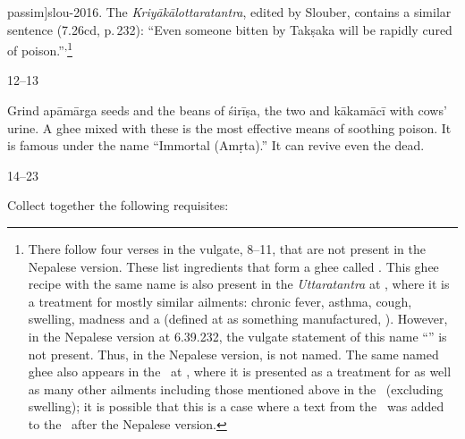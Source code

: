 \begin{translation}
{{                    passim}]{slou-2016}.  The
                    \emph{Kriyākālottaratantra}, edited by Slouber,
                    contains a similar sentence (7.26cd, p.\,232): “Even
                    someone bitten by Takṣaka will be rapidly cured of
                    poison.”}\textsuperscript{,}\footnote{There follow
                        four verses in the vulgate, 8--11, that are not
                        present in the Nepalese version.  These list
                        ingredients that form a ghee called
                        . This ghee recipe with
                        the same name is also present in the
                        \emph{Uttaratantra} at , where
                        it is a treatment for mostly similar ailments:
                        chronic fever, asthma, cough, swelling, madness and a
                         (defined at
                         as something manufactured,
                        ).  However, in the Nepalese version at
                        6.39.232, the vulgate statement of this name
                        “” is
                        not present. Thus, in the Nepalese version,
                         is not named. The same
                        named ghee also appears in the \CS\ at
                        , where it is presented as a
                        treatment for  as well as many
                        other ailments including those mentioned above in the
                        \SS\ (excluding swelling); it is possible that this
                        is a case where a text from the \CS\ was added to the
                        \SS\ after the Nepalese version.}
        
    
\item [12--13]    

Grind \gls{apāmārga} seeds and the beans of \gls{śirīṣa}, the two 
 and \gls{kākamācī} with cows' urine.  A ghee mixed with 
these is the most effective means of soothing poison.  It is famous under the 
name “Immortal (Amṛta).”  It can revive even the dead.


\item [14--23] 

Collect together the following requisites:


\end{translation}
